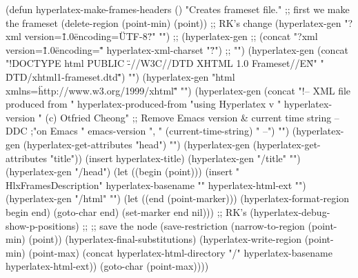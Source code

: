\begin{ifhtml}
{(defun hyperlatex-make-frames-headers ()
  "Creates frameset file."
  ;; first we make the frameset
  (delete-region (point-min) (point))
;; RK's change
  (hyperlatex-gen "?xml version=\"1.0\" encoding=\"UTF-8\"?" "\n")
;;  (hyperlatex-gen 
;;    (concat "?xml version=\"1.0\" encoding=\"" hyperlatex-xml-charset "\"?") 
;;    "\n")
  (hyperlatex-gen
   (concat "!DOCTYPE html PUBLIC \"-//W3C//DTD XHTML 1.0 Frameset//EN\"\n"
           "   \"DTD/xhtml1-frameset.dtd\"")
   "\n")
  (hyperlatex-gen "html xmlns=\"http://www.w3.org/1999/xhtml\"" "\n")
  (hyperlatex-gen
   (concat "!-- XML file produced from " hyperlatex-produced-from
	   "\n     using Hyperlatex v "
	   hyperlatex-version " (c) Otfried Cheong"
           ;; Remove Emacs version & current time string -- DDC
	   ;"\n     on Emacs " emacs-version ", " (current-time-string) 
           " --")
   "\n")
  (hyperlatex-gen (hyperlatex-get-attributes "head") "\n")
  (hyperlatex-gen (hyperlatex-get-attributes "title"))
  (insert hyperlatex-title)
  (hyperlatex-gen "/title" "\n")
  (hyperlatex-gen "/head")
  (let ((begin (point)))
    (insert "\\HlxFramesDescription{"
	    hyperlatex-basename "}{" hyperlatex-html-ext "}")
    (hyperlatex-gen "/html" "\n")
    (let ((end (point-marker)))
      (hyperlatex-format-region begin end)
      (goto-char end)
      (set-marker end nil)))
;; RK's
  (hyperlatex-debug-show-p-positions)
;;
  ;; save the node
  (save-restriction
    (narrow-to-region (point-min) (point))
    (hyperlatex-final-substitutions)
    (hyperlatex-write-region (point-min) (point-max)
			     (concat hyperlatex-html-directory "/"
				     hyperlatex-basename hyperlatex-html-ext))
    (goto-char (point-max))))
}
\T\end{ifhtml}


\T\begin{ifhtml}
\newcommand{\hhmm}{\HlxHHMM}
\T\end{ifhtml}


